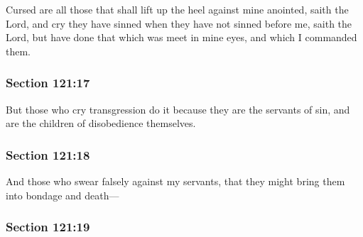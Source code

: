 		Cursed are all those that shall lift up the heel against mine anointed, saith the Lord, and cry they have sinned when they have not sinned before me, saith the Lord, but have done that which was meet in mine eyes, and which I commanded them.


	\subsubsection{Section 121:17} %
		\label{DC121-17}

		But those who cry transgression do it because they are the servants of sin, and are the children of disobedience themselves.


	\subsubsection{Section 121:18} %
		\label{DC121-18}

		And those who swear falsely against my servants, that they might bring them into bondage and death---


	\subsubsection{Section 121:19} %
		\label{DC121-19}

